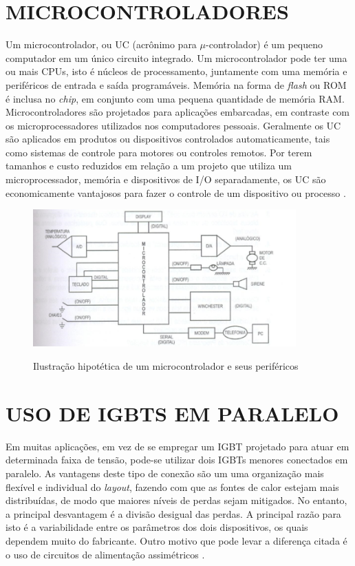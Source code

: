 \section{MICROCONTROLADORES}
\label{sec:micro}

Um microcontrolador, ou UC (acrônimo para   $\mu$-controlador) é um pequeno computador em um único circuito integrado. Um microcontrolador pode ter uma ou mais CPUs, isto é núcleos de processamento, juntamente com uma memória e periféricos de entrada e saída programáveis. Memória na forma de \textit{flash} ou ROM é inclusa no \textit{chip}, em conjunto com uma pequena quantidade de memória RAM. Microcontroladores são projetados para aplicações embarcadas, em contraste com os microprocessadores utilizados nos computadores pessoais. Geralmente os UC são aplicados em produtos ou dispositivos controlados automaticamente, tais como sistemas de controle para motores ou controles remotos. Por terem tamanhos e custo reduzidos em relação a um projeto que utiliza um microprocessador, memória e dispositivos de I/O separadamente, os UC são economicamente vantajosos para fazer o controle de um dispositivo ou processo \cite{Nicolosi}.


\begin{figure}[!htb]
    \centering
    \caption{Ilustração hipotética de um microcontrolador e seus periféricos}
    \includegraphics[width=0.9\textwidth]{./dados/figuras/micro}
    \label{fig:figura-uc}
\end{figure}

\pagebreak 

\section{USO DE IGBTS EM PARALELO}
\label{sec:paralleligbt}

Em muitas aplicações, em vez de se empregar um IGBT projetado para atuar em determinada faixa de tensão, pode-se utilizar dois IGBTs menores conectados em paralelo. As vantagens deste tipo de conexão são um uma organização mais flexível e individual do \textit{layout}, fazendo com que as fontes de calor estejam mais distribuídas, de modo que maiores níveis de perdas sejam mitigados. No entanto, a principal desvantagem é a divisão desigual das perdas. A principal razão para isto é a variabilidade entre os parâmetros dos dois dispositivos, os quais dependem muito do fabricante. Outro motivo que pode levar a diferença citada é o uso de circuitos de alimentação assimétricos \cite{Infineon}.
            
